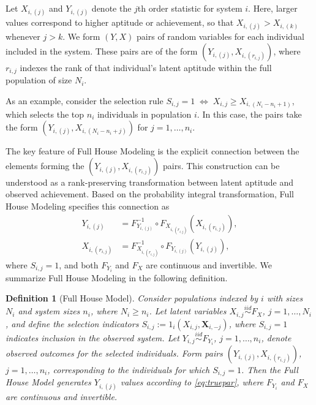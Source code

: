 \documentclass[12pt]{article}
\newtheorem{defn}[theorem]{Definition}
\begin{document}
Let $X_{i,(j)}$ and $Y_{i,(j)}$ denote the $j$th order statistic for system $i$. Here, larger values correspond to higher aptitude or achievement, so that $X_{i,(j)} > X_{i,(k)}$ whenever $j>k$. We form $(Y,X)$ pairs of random variables for each individual included in the system. These pairs are of the form $(Y_{i,(j)}, X_{i,(r_{i,j})})$, where $r_{i,j}$ indexes the rank of that individual's latent aptitude within the full population of size $N_i$.

As an example, consider the selection rule $S_{i,j} = 1 \;\Longleftrightarrow\; X_{i,j} \ge X_{i,(N_i-n_i+1)}$, which selects the top $n_i$ individuals in population $i$. In this case, the pairs take the form $(Y_{i,(j)}, X_{i,(N_i - n_i + j)})$ for $j = 1,\ldots,n_i$.

The key feature of Full House Modeling is the explicit connection between the elements forming the $(Y_{i,(j)}, X_{i,(r_{i,j})})$ pairs. This construction can be understood as a rank-preserving transformation between latent aptitude and observed achievement. Based on the probability integral transformation, Full House Modeling specifies this connection as
\begin{equation} \label{eq:truepar}
\begin{split}
  Y_{i, (j)} &= F_{Y_{i, (j)}}^{-1} \circ F_{X_{i, (r_{i,j})}} \left(X_{i, (r_{i,j})}\right), \\
  X_{i, (r_{i,j})} &= F_{X_{i, (r_{i,j})}}^{-1} \circ F_{Y_{i,(j)}} \left(Y_{i,(j)} \right),
\end{split}
\end{equation}
where $S_{i,j} = 1$, and both $F_{Y_i}$ and $F_X$ are continuous and invertible. We summarize Full House Modeling in the following definition.

\begin{defn} [Full House Model]
\label{def:fhm}
Consider populations indexed by $i$ with sizes $N_i$ and system sizes $n_i$, where $N_i \geq n_i$. Let latent variables $X_{i,j} \overset{iid}{\sim} F_X$, $j = 1,\ldots,N_i$, and define the selection indicators $S_{i,j} := 1_i(X_{i,j}, \mathbf{X}_{i,-j})$, where $S_{i,j}=1$ indicates inclusion in the observed system. Let $Y_{i,j} \overset{iid}{\sim} F_{Y_i}$, $j = 1,\ldots,n_i$, denote observed outcomes for the selected individuals. Form pairs $(Y_{i,(j)}, X_{i,(r_{i,j})})$, $j = 1,\ldots,n_i$, corresponding to the individuals for which $S_{i,j}=1$. Then the Full House Model generates $Y_{i,(j)}$ values according to \eqref{eq:truepar}, where $F_{Y_i}$ and $F_X$ are continuous and invertible.
\end{defn}
\end{document}
